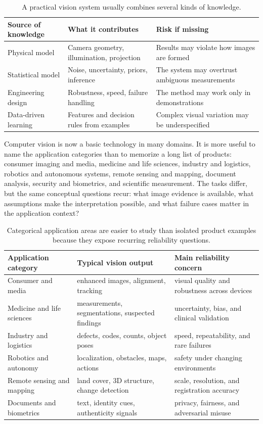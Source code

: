 \begin{table}[ht]
  \centering
  \begin{tabular}{@{}p{3.1cm}p{5cm}p{5cm}@{}}
    \toprule
    Source of knowledge & What it contributes & Risk if missing \\
    \midrule
    Physical model & Camera geometry, illumination, projection & Results may
      violate how images are formed \\
    Statistical model & Noise, uncertainty, priors, inference & The system may
      overtrust ambiguous measurements \\
    Engineering design & Robustness, speed, failure handling & The method may
      work only in demonstrations \\
    Data-driven learning & Features and decision rules from examples & Complex
      visual variation may be underspecified \\
    \bottomrule
  \end{tabular}
  \caption{A practical vision system usually combines several kinds of
  knowledge.}
\end{table}

\noindent
Computer vision is now a basic technology in many domains. It is more useful to
name the application categories than to memorize a long list of products:
consumer imaging and media, medicine and life sciences, industry and logistics,
robotics and autonomous systems, remote sensing and mapping, document analysis,
security and biometrics, and scientific measurement. The tasks differ, but the
same conceptual questions recur: what image evidence is available, what
assumptions make the interpretation possible, and what failure cases matter in
the application context?

\begin{table}[ht]
  \centering
  \begin{tabular}{@{}p{3.6cm}p{4.8cm}p{5.1cm}@{}}
    \toprule
    Application category & Typical vision output & Main reliability concern \\
    \midrule
    Consumer and media & enhanced images, alignment, tracking & visual quality
      and robustness across devices \\
    Medicine and life sciences & measurements, segmentations, suspected findings
      & uncertainty, bias, and clinical validation \\
    Industry and logistics & defects, codes, counts, object poses & speed,
      repeatability, and rare failures \\
    Robotics and autonomy & localization, obstacles, maps, actions & safety
      under changing environments \\
    Remote sensing and mapping & land cover, 3D structure, change detection &
      scale, resolution, and registration accuracy \\
    Documents and biometrics & text, identity cues, authenticity signals &
      privacy, fairness, and adversarial misuse \\
    \bottomrule
  \end{tabular}
  \caption{Categorical application areas are easier to study than isolated
  product examples because they expose recurring reliability questions.}
\end{table}

